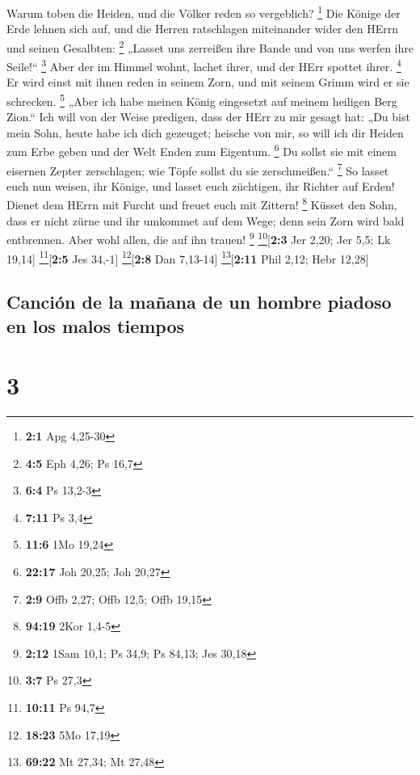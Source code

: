  Warum toben die Heiden, und die Völker reden so
vergeblich? \footnote{\textbf{2:1} Apg 4,25-30}  Die
Könige der Erde lehnen sich auf, und die Herren ratschlagen miteinander
wider den HErrn und seinen Gesalbten: \footnote{\textbf{4:5} Eph 4,26;
  Ps 16,7}  „Lasset uns zerreißen ihre Bande und von uns
werfen ihre Seile!{}`` \footnote{\textbf{6:4} Ps 13,2-3} 
Aber der im Himmel wohnt, lachet ihrer, und der HErr spottet ihrer.
\footnote{\textbf{7:11} Ps 3,4}  Er wird einst mit ihnen
reden in seinem Zorn, und mit seinem Grimm wird er sie schrecken.
\footnote{\textbf{11:6} 1Mo 19,24}  „Aber ich habe meinen
König eingesetzt auf meinem heiligen Berg Zion.``  Ich
will von der Weise predigen, dass der HErr zu mir gesagt hat: „Du bist
mein Sohn, heute habe ich dich gezeuget;  heische von mir,
so will ich dir Heiden zum Erbe geben und der Welt Enden zum Eigentum.
\footnote{\textbf{22:17} Joh 20,25; Joh 20,27}  Du sollst
sie mit einem eisernen Zepter zerschlagen; wie Töpfe sollst du sie
zerschmeißen.`` \footnote{\textbf{2:9} Offb 2,27; Offb 12,5; Offb 19,15}
 So lasset euch nun weisen, ihr Könige, und lasset euch
züchtigen, ihr Richter auf Erden!  Dienet dem HErrn mit
Furcht und freuet euch mit Zittern! \footnote{\textbf{94:19} 2Kor 1,4-5}
 Küsset den Sohn, dass er nicht zürne und ihr umkommet
auf dem Wege; denn sein Zorn wird bald entbrennen. Aber wohl allen, die
auf ihn trauen! \footnote{\textbf{2:12} 1Sam 10,1; Ps 34,9; Ps 84,13;
  Jes 30,18} \footnote{\textbf{3:7} Ps 27,3}{[}\textbf{2:3} Jer 2,20;
Jer 5,5; Lk 19,14{]} \footnote{\textbf{10:11} Ps 94,7}{[}\textbf{2:5}
Jes 34,-1{]} \footnote{\textbf{18:23} 5Mo 17,19}{[}\textbf{2:8} Dan
7,13-14{]} \footnote{\textbf{69:22} Mt 27,34; Mt 27,48}{[}\textbf{2:11}
Phil 2,12; Hebr 12,28{]}

\hypertarget{canciuxf3n-de-la-mauxf1ana-de-un-hombre-piadoso-en-los-malos-tiempos}{%
\subsection{Canción de la mañana de un hombre piadoso en los malos
tiempos}\label{canciuxf3n-de-la-mauxf1ana-de-un-hombre-piadoso-en-los-malos-tiempos}}

\hypertarget{section-2}{%
\section{3}\label{section-2}}

